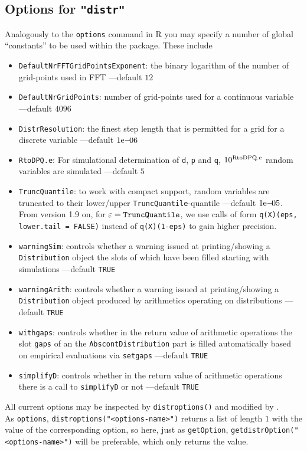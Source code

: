 \documentclass[11pt]{article}
\newcommand{\code}[1]{{\tt #1}}
\newcommand{\pkg}[1]{{\tt "#1"}}
\begin{document}
\subsection[Options for distr]{Options for \pkg{distr}}
%
Analogously to the \code{options} command in {\sf R} you may specify a number of
global ``constants'' to be used within the package. These include
\begin{itemize}
  \item \code{DefaultNrFFTGridPointsExponent}: the binary logarithm of the 
        number of grid-points used in FFT ---default $12$
  \item \code{DefaultNrGridPoints}: number of grid-points used for a continuous 
        variable ---default $4096$
  \item \code{DistrResolution}: the finest step length that is permitted for a 
        grid for a discrete variable ---default $1{\rm e-}\!06$
  \item \code{RtoDPQ.e}: For simulational determination of \code{d}, \code{p} 
         and \code{q}, $10^{\rm RtoDPQ.e}$ random variables are
  simulated ---default $5$
  \item \code{TruncQuantile}: to work with compact support, random variables are 
        truncated to their lower/upper
  \code{TruncQuantile}-quantile   ---default $1{\rm e-}\!05$.\\
  From version 1.9 on, for $\varepsilon={\tt \code{TruncQuantile}}$, we use calls of form 
  \code{q(X)(eps, lower.tail = FALSE)} instead of   \code{q(X)(1-eps)} to gain higher
  precision.
  \item \code{warningSim}: controls whether a warning issued at printing/showing 
        a \code{Distribution} object the slots of which have been
  filled starting with simulations ---default \code{TRUE}
  \item \code{warningArith}: controls whether a warning issued at
   printing/showing a \code{Distribution} object produced by arithmetics
  operating on distributions ---default \code{TRUE}
  \item \code{withgaps}: controls whether in the return value of arithmetic
  operations the slot \code{gaps} of an the \code{AbscontDistribution} part
  is filled automatically based on empirical evaluations via  \code{setgaps}
   ---default \code{TRUE}
  \item \code{simplifyD}: controls whether in the return value of arithmetic
  operations there is a call to \code{simplifyD} or not ---default \code{TRUE}
\end{itemize}
All current options may be inspected by \code{distroptions()}  and modified by
 \linebreak[4] \code{distroptions("<options-name>"=<value>)}.\\
As \code{options},  \code{distroptions("<options-name>")} returns a list of
 length $1$ with the value of the corresponding option,
so here, just as \code{getOption},  \code{getdistrOption("<options-name>")} will
 be preferable, which only returns the value.
\end{document}
